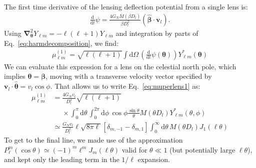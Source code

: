 \documentclass[twocolumn]{aastex63}
\newcommand{\vect}[1]{\boldsymbol{\mathbf{#1}}}
\newcommand{\dd}{\mathrm{d}}
\newcommand{\ellm}{{\ell m}}
\begin{document}
The first time derivative of the lensing deflection potential from a single lens is:
\begin{align}
\frac{\dd}{\dd t} \psi = \frac{4G_N M(\beta D_l)}{\beta D_l^2}(\hat{\vect{\beta}} \cdot {\vect{v}}_l ).
\end{align}
Using $\vect{\nabla}_{\vect{\theta}}^2 Y_{\ell m} = -\ell(\ell+1)Y_{\ell m}$ and integration by parts of Eq.~\ref{eq:harmdecomposition}, we find:
\begin{align}
\mu_{\ell m}^{(1)} = \sqrt{\ell(\ell+1)}\int \dd\Omega\, \left(\frac{\dd}{\dd t} \psi(\vect{\theta})\right) Y_{\ellm}^*(\vect{\theta}) \label{eq:muperlens1}
\end{align}
We can evaluate this expression for a lens on the celestial north pole, which implies $\vect{\theta} = \vect{\beta}$, moving with a transverse velocity vector specified by $\vect{v}_l \cdot \hat{\vect{\theta}}  = v_l \cos \phi$.
That allows us to write Eq.~\ref{eq:muperlens1} as:
\begin{align}
\mu_{\ell m}^{(1)} &= \frac{4 G_N v_l}{D_l^2} \sqrt{\ell(\ell+1)}\label{eq:muNP}\\
&\phantom{=}\times \int_0^\pi \dd \theta \, \int_0^{2\pi} \dd \phi \, \cos\phi  \frac{\sin \theta}{\theta} M(\theta D_l) Y^*_{\ell m}(\theta,\phi) \nonumber\\
&\simeq \frac{G_N v_l}{D_l^2} \ell \sqrt{8\pi \ell}\left[\delta_{m,-1}-\delta_{m,1}\right]\int_0^\infty \dd \theta \, M(\theta D_l) J_1(\ell \theta)\nonumber
\end{align}
To get to the final line, we made use of the approximation $P_\ell^m(\cos\theta) \simeq (-1)^m \ell^m J_m(\ell \theta)$ valid for $\theta \ll 1$ (but potentially large $\ell \theta$), and kept only the leading term in the  $1/\ell$ expansion. 
\end{document}
